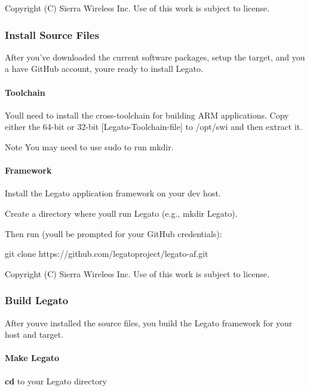 Copyright (C) Sierra Wireless Inc. Use of this work is subject to license. \hypertarget{getstartedCLinstall}{}\subsubsection{Install Source Files}\label{getstartedCLinstall}
After you’ve downloaded the current software packages, setup the target, and you a have Git\+Hub account, you\textquotesingle{}re ready to install Legato.\hypertarget{getstarted_c_linstall_getstartedCLinstall_toolchain}{}\paragraph{Toolchain}\label{getstarted_c_linstall_getstartedCLinstall_toolchain}
You\textquotesingle{}ll need to install the cross-\/toolchain for building A\+R\+M applications. Copy either the 64-\/bit or 32-\/bit \mbox{[}Legato-\/\+Toolchain-\/file\mbox{]} to /opt/swi and then extract it.




\begin{DoxyNote}{Note}
You may need to use {\ttfamily sudo} to run {\ttfamily mkdir}.
\end{DoxyNote}
\hypertarget{getstarted_c_linstall_getstartedCLinstall_framework}{}\paragraph{Framework}\label{getstarted_c_linstall_getstartedCLinstall_framework}
Install the Legato application framework on your dev host.

Create a directory where you\textquotesingle{}ll run Legato (e.\+g., mkdir Legato).

Then run (you\textquotesingle{}ll be prompted for your Git\+Hub credentials)\+: \begin{DoxyVerb}git clone https://github.com/legatoproject/legato-af.git
\end{DoxyVerb}






Copyright (C) Sierra Wireless Inc. Use of this work is subject to license. \hypertarget{getstartedCLbuild}{}\subsubsection{Build Legato}\label{getstartedCLbuild}
After you\textquotesingle{}ve installed the source files, you build the Legato framework for your host and target.\hypertarget{getstarted_c_lbuild_getstartedCLbuild_makeLegato}{}\paragraph{Make Legato}\label{getstarted_c_lbuild_getstartedCLbuild_makeLegato}
{\bfseries cd} to your Legato directory

